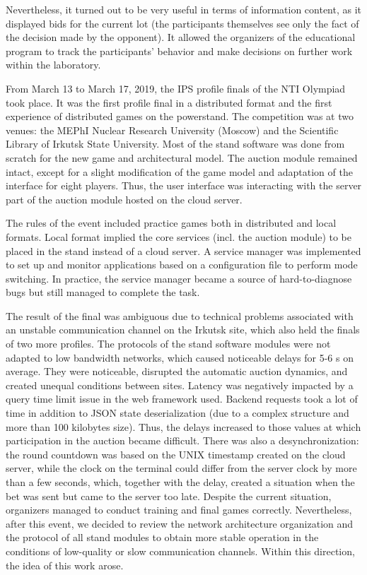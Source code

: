 \documentclass[
]{ceurart}
\begin{document}
Nevertheless, it turned out to be very useful in terms of information content, as it displayed bids for the current lot (the participants themselves see only the fact of the decision made by the opponent). It allowed the organizers of the educational program to track the participants' behavior and make decisions on further work within the laboratory.

From March 13 to March 17, 2019, the IPS profile finals of the NTI Olympiad took place. It was the first profile final in a distributed format and the first experience of distributed games on the powerstand. The competition was at two venues: the MEPhI Nuclear Research University (Moscow) and the Scientific Library of Irkutsk State University. Most of the stand software was done from scratch for the new game and architectural model. The auction module remained intact, except for a slight modification of the game model and adaptation of the interface for eight players. Thus, the user interface was interacting with the server part of the auction module hosted on the cloud server.

The rules of the event included practice games both in distributed and local formats. Local format implied the core services (incl. the auction module) to be placed in the stand instead of a cloud server. A service manager was implemented to set up and monitor applications based on a configuration file to perform mode switching. In practice, the service manager became a source of hard-to-diagnose bugs but still managed to complete the task.

The result of the final was ambiguous due to technical problems associated with an unstable communication channel on the Irkutsk site, which also held the finals of two more profiles. The protocols of the stand software modules were not adapted to low bandwidth networks, which caused noticeable delays for 5-6 s on average. They were noticeable, disrupted the automatic auction dynamics, and created unequal conditions between sites. Latency was negatively impacted by a query time limit issue in the web framework used. Backend requests took a lot of time in addition to JSON state deserialization (due to a complex structure and more than 100 kilobytes size). Thus, the delays increased to those values ​​at which participation in the auction became difficult. There was also a desynchronization: the round countdown was based on the UNIX timestamp created on the cloud server, while the clock on the terminal could differ from the server clock by more than a few seconds, which, together with the delay, created a situation when the bet was sent but came to the server too late. Despite the current situation, organizers managed to conduct training and final games correctly. Nevertheless, after this event, we decided to review the network architecture organization and the protocol of all stand modules to obtain more stable operation in the conditions of low-quality or slow communication channels. Within this direction, the idea of ​​this work arose.
\end{document}
